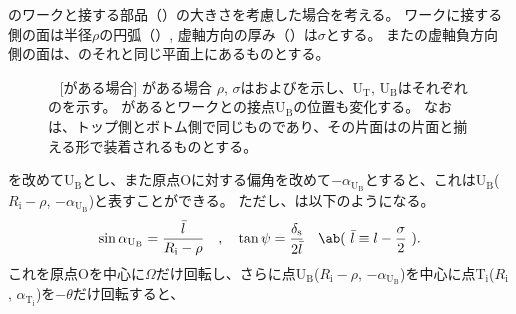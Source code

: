 \clearpage
\Jig のワークと接する部品（\textbf{\ReceiverPlate}）の大きさを考慮した場合を考える。
ワークに接する側の面は半径$\rho$の円弧（\ReceiverPlateRadius）, 虚軸方向の厚み（\ReceiverPlateWidth）は$\sigma$とする。
また\ReceiverPlate の虚軸負方向側の面は、\Jig のそれと同じ平面上にあるものとする。
\begin{figure}[p]%
\begin{Figbox}[valign=top]%
%
\vfill~
[\ReceiverPlate がある場合]{%
 \ReceiverPlate がある場合\newline
 $\rho$, $\sigma$は\ReceiverPlateRadius および\ReceiverPlateWidth を示し、U$_\mathrm T$, U$_\mathrm B$はそれぞれの\ReceiverPlateCenter を示す。
 \ReceiverPlate があるとワークとの接点U$_\mathrm B$の位置も変化する。
 なお\ReceiverPlate は、トップ側とボトム側で同じものであり、その片面は\Jig の片面と揃える形で装着されるものとする。
 }%
\end{Figbox}%
\end{figure}%
\ReceiverPlateCenter を改めてU$_\mathrm B$とし、また原点Oに対する偏角を改めて$-\alpha_{\mathrm U_\mathrm B}$とすると、これはU$_\mathrm B$($R_\mathrm i-\rho$, $-\alpha_{\mathrm U_\mathrm B}$)と表すことができる。
ただし、は以下のようになる。
\begin{align*}
  \sin\alpha_{\mathrm U_\mathrm B} = \frac{\bar l}{R_\mathrm i-\rho}\quad, \quad
  \tan\psi = \frac{\delta_\mathrm s}{2\bar l} \quad
  \ab(~\bar l \equiv l-\frac\sigma2~).
\end{align*}
これを原点Oを中心に$\Omega$だけ回転し、さらに点U$_\mathrm B$($R_\mathrm i-\rho$, $-\alpha_{\mathrm U_\mathrm B}$)を中心に点T$_\mathrm i$($R_\mathrm i$, $\alpha_{\mathrm T_\mathrm i}$)を$-\theta$だけ回転すると、
